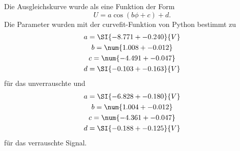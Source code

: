 Die Ausgleichskurve wurde als eine Funktion der Form
\begin{equation*}
    U = a\cos{(b\phi + c)} +d .
\end{equation*}
Die Parameter wurden mit der curvefit-Funktion von Python bestimmt zu
\begin{gather*}
    a = \SI{-8.771 +- 0.240}{V} \\
    b = \num{1.008 +- 0.012} \\
    c = \num{-4.491 +- 0.047} \\
    d = \SI{-0.103 +- 0.163}{V} \\
\end{gather*}
für das unverrauschte und
\begin{gather*}
    a = \SI{-6.828 +- 0.180}{V} \\
    b = \num{1.004 +- 0.012} \\
    c = \num{-4.361 +- 0.047} \\
    d = \SI{-0.188 +- 0.125}{V} \\
\end{gather*}
für das verrauschte Signal.
